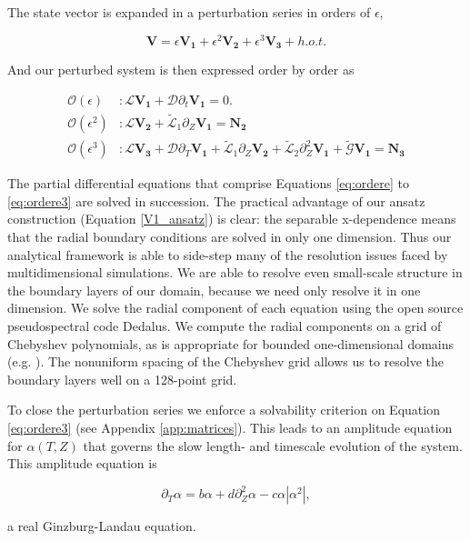 \documentclass{emulateapj}
\newcommand{\beq}{\begin{equation}}
\newcommand{\eeq}{\end{equation}}
\newcommand{\citei}[1]{\citeauthor{#1} \citeyear{#1}}
\begin{document}
The state vector is expanded in a perturbation series in orders of $\epsilon$,

\beq
\label{eq:pert_exp}
\mathbf{V} = \epsilon\mathbf{V_1} + \epsilon^2\mathbf{V_2} + \epsilon^3\mathbf{V_3} + h.o.t.
\eeq

And our perturbed system is then expressed order by order as

\begin{align}
\mathcal{O}(\epsilon)&: \mathcal{L}\mathbf{V_1} + \mathcal{D}\partial_t \mathbf{V_1} = 0. \label{eq:ordere}\\
\mathcal{O}(\epsilon^2)&: \mathcal{L}\mathbf{V_2} + \widetilde{\mathcal{L}}_1 \partial_Z \mathbf{V_1} = \mathbf{N_2} \label{eq:ordere2}\\
\mathcal{O}(\epsilon^3)&: \mathcal{L} \mathbf{V_3} + \mathcal{D}\partial_T \mathbf{V_1}  + \widetilde{\mathcal{L}}_1\partial_Z\mathbf{V_2} + \widetilde{\mathcal{L}}_2\partial_Z^2\mathbf{V_1} + \widetilde{\mathcal{G}}\mathbf{V_1} = \mathbf{N_3} \label{eq:ordere3}
\end{align}

The partial differential equations that comprise Equations \ref{eq:ordere} to \ref{eq:ordere3} are solved in succession. The practical advantage of our ansatz construction (Equation \ref{V1_ansatz}) is clear: the separable x-dependence means that the radial boundary conditions are solved in only one dimension. Thus our analytical framework is able to side-step many of the resolution issues faced by multidimensional simulations. We are able to resolve even small-scale structure in the boundary layers of our domain, because we need only resolve it in one dimension. We solve the radial component of each equation using the open source pseudospectral code Dedalus. We compute the radial components on a grid of Chebyshev polynomials, as is appropriate for bounded one-dimensional domains (e.g. \citei{Boyd:2001aa}). The nonuniform spacing of the Chebyshev grid allows us to resolve the boundary layers well on a 128-point grid.

To close the perturbation series we enforce a solvability criterion on Equation \ref{eq:ordere3} (see Appendix \ref{app:matrices}). This leads to an amplitude equation for $\alpha(T, Z)$ that governs the slow length- and timescale evolution of the system. This amplitude equation is 

\beq
\label{eq:gle}
\partial_T \alpha = b \alpha + d \partial_Z^2 \alpha - c \alpha \left|\alpha^2\right|,
\eeq

a real Ginzburg-Landau equation. 
\end{document}
